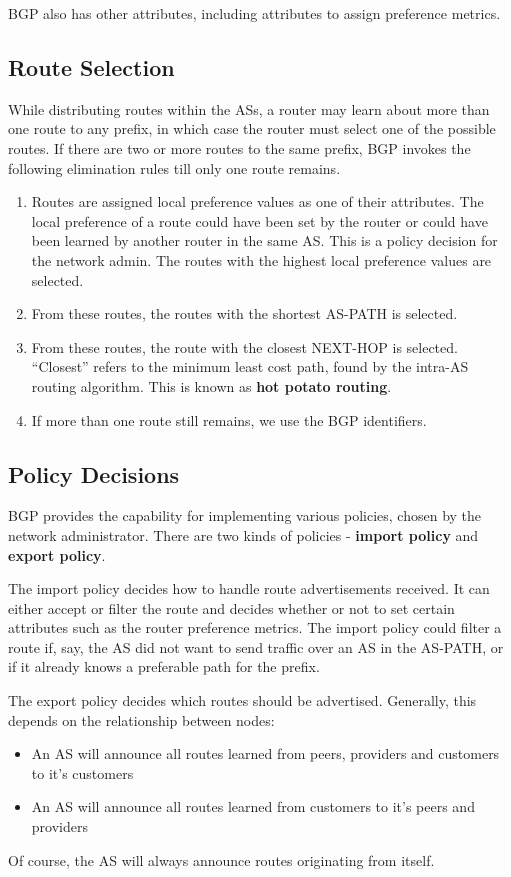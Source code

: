 \documentclass[12pt,letterpaper]{book}
\theoremstyle{definition}
\begin{document}
BGP also has other attributes, including attributes to assign preference metrics. 

\subsection{Route Selection}

While distributing routes within the ASs, a router may learn about more than one route to any prefix, in which case the router must select one of the possible routes. If there are two or more routes to the same prefix, BGP invokes the following elimination rules till only one route remains.

\begin{enumerate}
  \item Routes are assigned local preference values as one of their attributes. The local preference of a route could have been set by the router or could have been learned by another router in the same AS. This is a policy decision for the network admin. The routes with the highest local preference values are selected.
  \item From these routes, the routes with the shortest AS-PATH is selected.
  \item From these routes, the route with the closest NEXT-HOP is selected. ``Closest'' refers to the minimum least cost path, found by the intra-AS routing algorithm. This is known as \textbf{hot potato routing}.
  \item If more than one route still remains, we use the BGP identifiers.
  \end{enumerate}

\subsection{Policy Decisions}

BGP provides the capability for implementing various policies, chosen by the network administrator. There are two kinds of policies - \textbf{import policy} and \textbf{export policy}.

The import policy decides how to handle route advertisements received. It can either accept or filter the route and decides whether or not to set certain attributes such as the router preference metrics. The import policy could filter a route if, say, the AS did not want to send traffic over an AS in the AS-PATH, or if it already knows a preferable path for the prefix.

The export policy decides which routes should be advertised. Generally, this depends on the relationship between nodes:
\begin{itemize}
  \item An AS will announce all routes learned from peers, providers and customers to it's customers
  \item An AS will announce all routes learned from customers to it's peers and providers
\end{itemize} 
Of course, the AS will always announce routes originating from itself.
\end{document}
